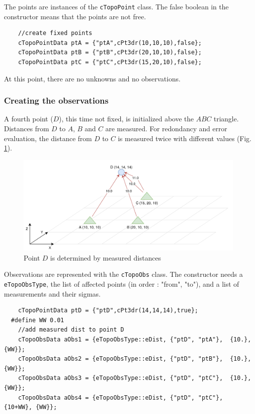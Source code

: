 The points are instances of the \texttt{cTopoPoint} class.
The false boolean in the constructor means that the points are not free.

\begin{lstlisting}
    //create fixed points
    cTopoPointData ptA = {"ptA",cPt3dr(10,10,10),false};
    cTopoPointData ptB = {"ptB",cPt3dr(20,10,10),false};
    cTopoPointData ptC = {"ptC",cPt3dr(15,20,10),false};
\end{lstlisting}

At this point, there are no unknowns and no observations.


\subsubsection{Creating the observations}

A fourth point ($D$), this time not fixed, is initialized above the $ABC$ triangle.
Distances from $D$ to $A$, $B$ and $C$
are measured. For redondancy and error evaluation, the distance from $D$ to $C$ is measured twice
with different values (Fig. \ref{fig:topoEx2}).

\begin{figure}[!h]
\centering
\includegraphics[width=12cm]{Programmer/benchtopo2.png}
\caption{Point $D$ is determined by measured distances}
\label{fig:topoEx2}
\end{figure}

Observations are represented with the \texttt{cTopoObs} class.
The constructor needs a \texttt{eTopoObsType}, the list of affected points
(in order : "from", "to"), and a list of measurements and their sigmas.

\begin{lstlisting}
    cTopoPointData ptD = {"ptD",cPt3dr(14,14,14),true};
  #define WW 0.01
    //add measured dist to point D
    cTopoObsData aObs1 = {eTopoObsType::eDist, {"ptD", "ptA"},  {10.}, {WW}};
    cTopoObsData aObs2 = {eTopoObsType::eDist, {"ptD", "ptB"},  {10.}, {WW}};
    cTopoObsData aObs3 = {eTopoObsType::eDist, {"ptD", "ptC"},  {10.}, {WW}};
    cTopoObsData aObs4 = {eTopoObsType::eDist, {"ptD", "ptC"},  {10+WW}, {WW}};
\end{lstlisting}

